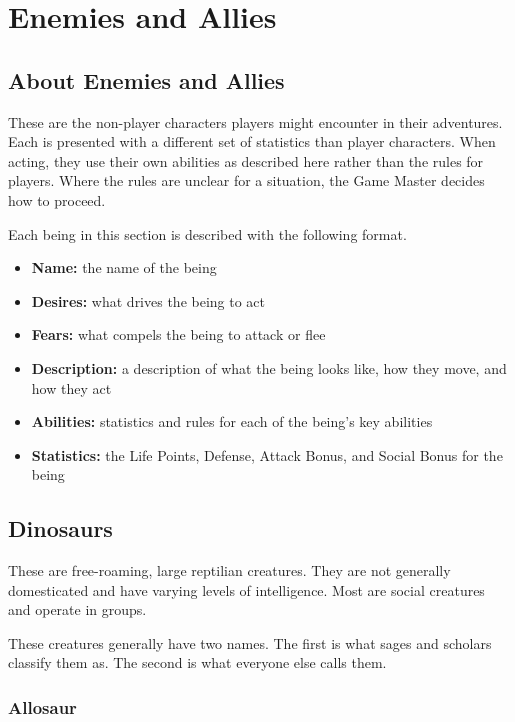 \chapter{Enemies and Allies}

\begin{multicols}{2}

\section{About Enemies and Allies}

These are the non-player characters players might encounter in
their adventures. Each is presented with a different set of
statistics than player characters. When acting, they use their
own abilities as described here rather than the rules for players.
Where the rules are unclear for a situation, the Game Master decides
how to proceed.

Each being in this section is described with the following format.

\begin{itemize}
  \item \textbf{Name:} the name of the being
  \item \textbf{Desires:} what drives the being to act
  \item \textbf{Fears:} what compels the being to attack or flee
  \item \textbf{Description:} a description of what the being looks like, how they move, and how they act
  \item \textbf{Abilities:} statistics and rules for each of the being's key abilities
  \item \textbf{Statistics:} the Life Points, Defense, Attack Bonus, and Social Bonus for the being
\end{itemize}

\section{Dinosaurs}

These are free-roaming, large reptilian creatures. They
are not generally domesticated and have varying levels
of intelligence. Most are social creatures and operate in
groups.

These creatures generally have two names. The first is
what sages and scholars classify them as. The second is
what everyone else calls them.

\subsection{Allosaur}


\end{multicols}
